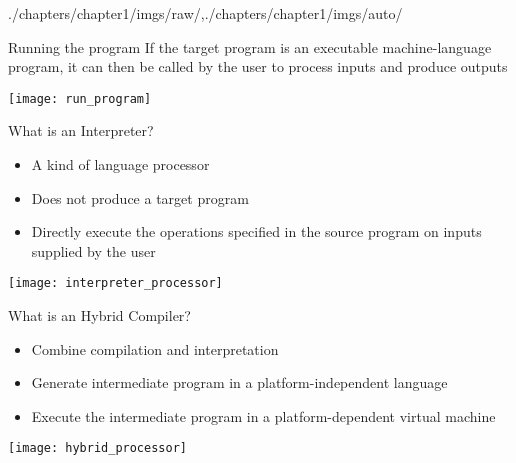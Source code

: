 \begin{graphicspathcontext}{{./chapters/chapter1/imgs/raw/},{./chapters/chapter1/imgs/auto/}}
\begin{bibunit}[apalike]
\begin{frame}{Running the program}
	If the target program is an executable machine-language program, it can then be called by the user to process inputs and produce outputs
	\vfill
	\begin{center}
		\texttt{[image: run\_program]}
	\end{center}
\end{frame}

\begin{frame}{{What is an} Interpreter?}
	\begin{itemize}
	\item A kind of language processor
	\item Does not produce a target program
	\item Directly execute the operations specified in the source program on inputs supplied by the user
	\end{itemize}
	\vfill
	\begin{center}
		\texttt{[image: interpreter\_processor]}
	\end{center}
\end{frame}

\begin{frame}{{What is an} Hybrid Compiler?}
	\begin{itemize}
	\item Combine compilation and interpretation
	\item Generate intermediate program in a platform-independent language
	\item Execute the intermediate program in a platform-dependent virtual machine
	\end{itemize}
	\vfill
	\begin{center}
		\texttt{[image: hybrid\_processor]}
	\end{center}
\end{frame}


\end{bibunit}
\end{graphicspathcontext}
